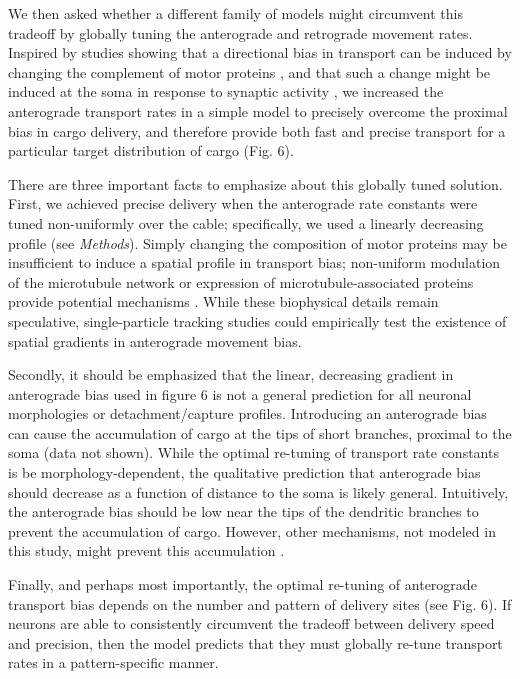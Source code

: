 \documentclass[11pt]{wlpeerj}
\begin{document}
We then asked whether a different family of models might circumvent this tradeoff by globally tuning the anterograde and retrograde movement rates. Inspired by studies showing that a directional bias in transport can be induced by changing the complement of motor proteins \citep{Kanai2004,Amrute2012}, and that such a change might be induced at the soma in response to synaptic activity \citep{Puthanveettil_2008}, we increased the anterograde transport rates in a simple model to precisely overcome the proximal bias in cargo delivery, and therefore provide both fast and precise transport for a particular target distribution of cargo (Fig. 6). 

There are three important facts to emphasize about this globally tuned solution. First, we achieved precise delivery when the anterograde rate constants were tuned non-uniformly over the cable; specifically, we used a linearly decreasing profile (see \textit{Methods}). Simply changing the composition of motor proteins \citep{Amrute2012} may be insufficient to induce a spatial profile in transport bias; non-uniform modulation of the microtubule network or expression of microtubule-associated proteins provide potential mechanisms \citep{Kwan2008,Soundararajan_2014}. While these biophysical details remain speculative, single-particle tracking studies could empirically test the existence of spatial gradients in anterograde movement bias.

Secondly, it should be emphasized that the linear, decreasing gradient in anterograde bias used in figure 6 is not a general prediction for all neuronal morphologies or detachment/capture profiles. Introducing an anterograde bias can cause the accumulation of cargo at the tips of short branches, proximal to the soma (data not shown). While the optimal re-tuning of transport rate constants is be morphology-dependent, the qualitative prediction that anterograde bias should decrease as a function of distance to the soma is likely general. Intuitively, the anterograde bias should be low near the tips of the dendritic branches to prevent the accumulation of cargo. However, other mechanisms, not modeled in this study, might prevent this accumulation \citep{Soundararajan_2014}.

Finally, and perhaps most importantly, the optimal re-tuning of anterograde transport bias depends on the number and pattern of delivery sites (see Fig. 6). If neurons are able to consistently circumvent the tradeoff between delivery speed and precision, then the model predicts that they must globally re-tune transport rates in a pattern-specific manner.
\end{document}
